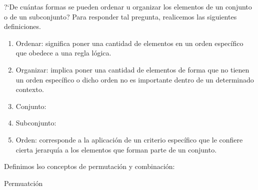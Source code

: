 ?`De cu\'antas formas se pueden ordenar u organizar los elementos de un conjunto o de un subconjunto? Para responder tal pregunta, realicemos
las siguientes definiciones.
\begin{definition}
    \hspace{0.5mm}
    \begin{enumerate}[{\rm 1.}]
        \item {\rm Ordenar: } significa poner una cantidad de elementos en un orden espec\'ifico que obedece a una regla l\'ogica.
        \item {\rm Organizar: } implica poner una cantidad de elementos de forma que no tienen un orden espec\'ifico o dicho orden no es importante
              dentro de un determinado contexto.
        \item {\rm Conjunto: }
        \item {\rm Subconjunto: }
        \item {\rm Orden: } corresponde a la aplicaci\'on de un criterio espec\'ifico que le confiere cierta jerarqu\'ia a los elementos que forman parte de un conjunto.

    \end{enumerate}
\end{definition}

Definimos lso conceptos de permutaci\'on y combinaci\'on:

\begin{definition}{Permuatci\'on}

\end{definition}




